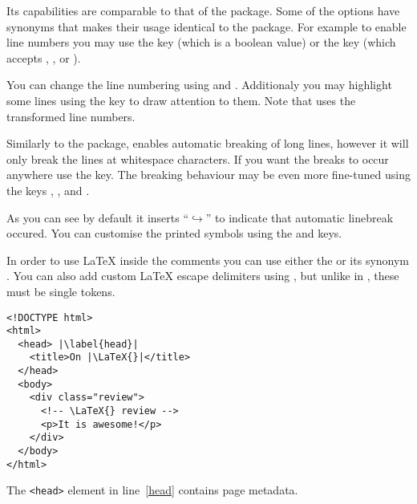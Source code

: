 Its capabilities are comparable to that of the  package. Some of
the options have synonyms that makes their usage identical to the
 package. For example to enable line numbers you may use the
 key (which is a boolean value) or the  key
(which accepts , ,  or ).
You can change the line numbering using  and
. Additionaly you may highlight some lines using the
 key to draw attention to them. Note that
 uses the transformed line numbers.
\begin{chktexignore}
\end{chktexignore}

Similarly to the  package,  enables automatic
breaking of long lines, however it will only break the lines at whitespace
characters. If you want the breaks to occur anywhere use the
 key. The breaking behaviour may be even more
fine-tuned using the keys , ,
 and .
As you can see by default it inserts \enquote{\(\hookrightarrow\)} to indicate
that automatic linebreak occured. You can customise the printed symbols using
the  and  keys.

In order to use \LaTeX{} inside the comments you can use either the
 or its synonym . You can also add custom
\LaTeX{} escape delimiters using , but unlike in
, these must be single tokens.
\begin{example}
\begin{verbatim}
<!DOCTYPE html>
<html>
  <head> |\label{head}|
    <title>On |\LaTeX{}|</title>
  </head>
  <body>
    <div class="review">
      <!-- \LaTeX{} review -->
      <p>It is awesome!</p>
    </div>
  </body>
</html>
\end{verbatim}
The \texttt{<head>} 
element in line~\ref{head}
contains page metadata.
\end{example}

